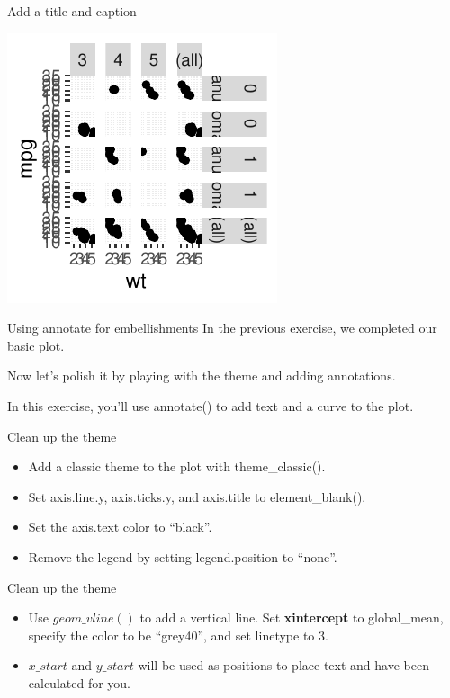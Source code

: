 \documentclass[
  ignorenonframetext,
]{beamer}
\providecommand{\tightlist}{%
  \setlength{\itemsep}{0pt}\setlength{\parskip}{0pt}}
\begin{document}
\begin{frame}[fragile]{Add a title and caption}
\begin{center}\includegraphics[width=0.5\linewidth]{Figs/unnamed-chunk-101-1} \end{center}
\end{frame}

\begin{frame}{Using annotate for embellishments}
\label{using-annotate-for-embellishments}
In the previous exercise, we completed our basic plot.

Now let's polish it by playing with the theme and adding annotations.

In this exercise, you'll use annotate() to add text and a curve to the
plot.
\end{frame}

\begin{frame}{Clean up the theme}
\label{clean-up-the-theme}
\begin{itemize}
\tightlist
\item
  Add a classic theme to the plot with theme\_classic().
\item
  Set axis.line.y, axis.ticks.y, and axis.title to element\_blank().
\item
  Set the axis.text color to ``black''.
\item
  Remove the legend by setting legend.position to ``none''.
\end{itemize}
\end{frame}

\begin{frame}{Clean up the theme}
\label{clean-up-the-theme-1}
\begin{itemize}
\item
  Use \(geom\_vline()\) to add a vertical line. Set \textbf{xintercept}
  to global\_mean, specify the color to be ``grey40'', and set linetype
  to 3.
\item
  \(x\_start\) and \(y\_start\) will be used as positions to place text
  and have been calculated for you.
\end{itemize}
\end{frame}
\end{document}
